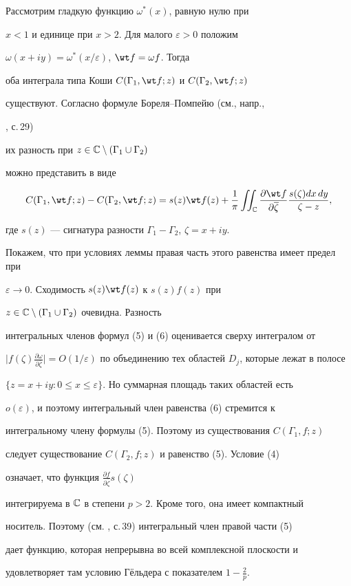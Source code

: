 \begin{pf}


Рассмотрим гладкую функцию $\omega^{*}(x)$, равную нулю при


$x<1$ и единице при $x>2$. Для малого $\varepsilon>0$ положим


$\omega(x+iy) = \omega^{*}(x/\varepsilon)$, $\wt f = \omega f$. Тогда


оба интеграла типа Коши $C(\Gamma_1, \wt f;z)$ и $C(\Gamma_2, \wt f;z)$


существуют. Согласно формуле Бореля--Помпейю (см., напр.,


\cite{V}, с.\,29)


их разность при $z\in {\Bbb C}\setminus (\Gamma_1\cup\Gamma_2)$


можно представить в виде


\begin{equation}


C(\Gamma_1, \wt f;z) - C(\Gamma_2, \wt f;z) = s(z)\wt f(z) +


\frac{1}{\pi}\iint_{\Bbb C}{\frac{\partial\wt f}


{\partial \overline{\zeta}}


\frac{s(\zeta)dx\,dy}{\zeta - z}},


\end{equation}


где $s(z)$ --- сигнатура разности $\Gamma_1 - \Gamma_2$, $\zeta = x+iy$.


Покажем, что при условиях леммы правая часть этого равенства имеет предел при


$\varepsilon\to 0$. Сходимость $s(z)\wt f(z)$ к $s(z)f(z)$ при


$z\in {\Bbb C}\setminus (\Gamma_1\cup\Gamma_2)$ очевидна. Разность


интегральных членов формул (5) и (6) оценивается сверху интегралом от


$\big|f(\zeta)\frac{\partial\omega}{\partial\overline\zeta}\big| =


O(1/\varepsilon)$ по объединению тех областей $D_j$, которые лежат в полосе


$\{z=x+iy:0\le x \le \varepsilon\}$. Но суммарная площадь таких областей есть


$o(\varepsilon)$, и поэтому интегральный член равенства (6) стремится к


интегральному члену формулы (5). Поэтому из существования $C(\Gamma_1, f;z)$


следует существование $C(\Gamma_2, f;z)$ и равенство (5). Условие (4)


означает, что функция $\frac{\partial f}{\partial \overline{\zeta}}s(\zeta)$


интегрируема в ${\Bbb C}$ в степени $p>2$. Кроме того, она имеет компактный


носитель. Поэтому (см. \cite{V}, с.\,39) интегральный член правой части (5)


дает функцию, которая непрерывна во всей комплексной плоскости и


удовлетворяет там условию Г\"ельдера с показателем $1 - \frac{2}{p}$.


\end{pf}






